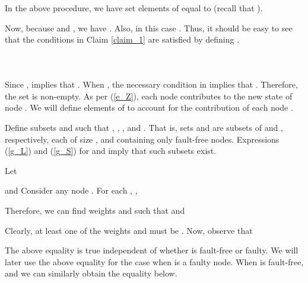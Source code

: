 \documentclass[letterpaper, 12pt]{article}
\begin{document}
In the above procedure, we have set  elements of 
equal to  (recall that ).

Now, because  and , we have
.
Also, in this case . Thus, it should
be easy to see that the conditions in Claim \ref{claim_1} are satisfied
by defining .


~

\subsubsection{}

Since ,
 implies that .
When , the necessary condition in \cite{IBA_sync} implies that
. Therefore, the set  is non-empty.
As per (\ref{e_Z}), each node  contributes 
to the new state  of node . We will define elements
of  to account for the contribution of each node .

Define subsets  and  such that
, , ,
and . That is, sets  and 
are subsets of  and , respectively, each of size ,
and containing only fault-free nodes.
Expressions (\ref{g_L}) and (\ref{g_S}) for  and 
imply that such subsets exist.

Let 

and 
Consider any node .
For each , ,

Therefore,
we can find weights  and 
 such that
 and

Clearly, at least one of the weights  and 
must be .
Now, observe that

The above equality is true independent of whether  is fault-free or faulty.
We will later use the above equality for the case when  is a faulty node.
When  is fault-free,  and we can similarly obtain the equality below.
\end{document}
